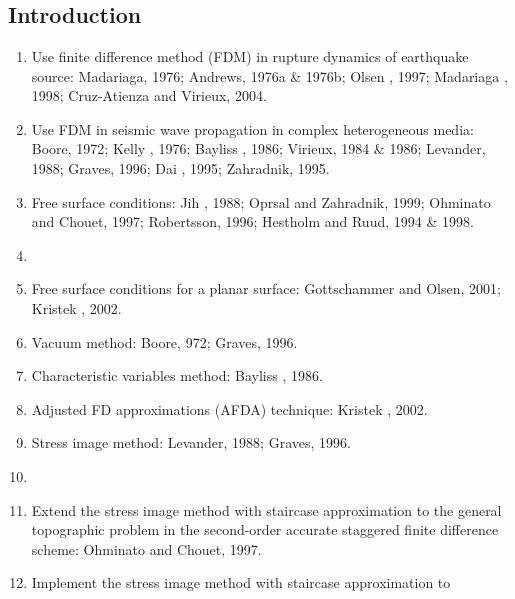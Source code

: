 \renewcommand{\pmk}{ZhangW\_2006\_GJI\_Traction image method}
\renewcommand{\prf}{Modelling/\pmk.pdf}
\renewcommand{\pti}{Traction image method for irregular free surface boundaries
in finite difference seismic wave simulation}
\renewcommand{\pay}{Wei Zhang, Xiaofei Chen, 2006}
\renewcommand{\pjo}{Geophys. J. Int.}
\renewcommand{\pda}{2016/10/29 Sat.}

\section{\pinfo}
\subsection{Introduction}
\begin{enumerate}[\hspace{10mm}*]
  \item Use finite difference method (FDM) in rupture dynamics of
    earthquake source: Madariaga, 1976; Andrews, 1976a \& 1976b;
    Olsen \etal, 1997; Madariaga \etal, 1998; Cruz-Atienza and Virieux, 2004.
  \item Use FDM in seismic wave propagation in complex heterogeneous media:
    Boore, 1972; Kelly \etal, 1976; Bayliss \etal, 1986; Virieux, 1984 \& 1986;
    Levander, 1988; Graves, 1996; Dai \etal, 1995; Zahradnik, 1995.
  \item Free surface conditions: Jih \etal, 1988; Oprsal and Zahradnik, 1999;
    Ohminato and Chouet, 1997; Robertsson, 1996; Hestholm and Ruud, 1994 \& 1998.
  \item \sline
  \item Free surface conditions for a planar surface:
    Gottschammer and Olsen, 2001; Kristek \etal, 2002.
  \item Vacuum method: Boore, 972; Graves, 1996.
  \item Characteristic variables method: Bayliss \etal, 1986.
  \item Adjusted FD approximations (AFDA) technique: Kristek \etal, 2002.
  \item Stress image method: Levander, 1988; Graves, 1996.
  \item \sline
  \item Extend the stress image method with staircase approximation to
    the general topographic problem in the second-order accurate
    staggered finite difference scheme: Ohminato and Chouet, 1997.
  \item Implement the stress image method with staircase approximation to

\end{enumerate}
